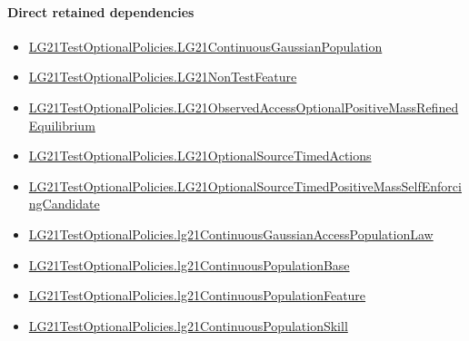 \documentclass[10pt]{article}
\begin{document}
\paragraph{Direct retained dependencies}
\begin{itemize}\raggedright
\item \hyperlink{paper-prerequisite-f5e1c886d250142b}{LG21\allowbreak{}Test\allowbreak{}Optional\allowbreak{}Policies.\allowbreak{}LG21\allowbreak{}Continuous\allowbreak{}Gaussian\allowbreak{}Population}
\item \hyperlink{governing-declaration-81cb73bf3869c56d}{LG21\allowbreak{}Test\allowbreak{}Optional\allowbreak{}Policies.\allowbreak{}LG21\allowbreak{}Non\allowbreak{}Test\allowbreak{}Feature}
\item \hyperlink{governing-declaration-54d577fbb0a632ec}{LG21\allowbreak{}Test\allowbreak{}Optional\allowbreak{}Policies.\allowbreak{}LG21\allowbreak{}Observed\allowbreak{}Access\allowbreak{}Optional\allowbreak{}Positive\allowbreak{}Mass\allowbreak{}Refined\allowbreak{}Equilibrium}
\item \hyperlink{governing-declaration-c053cef5da7104c1}{LG21\allowbreak{}Test\allowbreak{}Optional\allowbreak{}Policies.\allowbreak{}LG21\allowbreak{}Optional\allowbreak{}Source\allowbreak{}Timed\allowbreak{}Actions}
\item \hyperlink{governing-declaration-d43eac84fcf5cb20}{LG21\allowbreak{}Test\allowbreak{}Optional\allowbreak{}Policies.\allowbreak{}LG21\allowbreak{}Optional\allowbreak{}Source\allowbreak{}Timed\allowbreak{}Positive\allowbreak{}Mass\allowbreak{}Self\allowbreak{}Enforcing\allowbreak{}Candidate}
\item \hyperlink{governing-declaration-fa49b6c4b938413f}{LG21\allowbreak{}Test\allowbreak{}Optional\allowbreak{}Policies.\allowbreak{}lg21\allowbreak{}Continuous\allowbreak{}Gaussian\allowbreak{}Access\allowbreak{}Population\allowbreak{}Law}
\item \hyperlink{governing-declaration-3b5146b167dee236}{LG21\allowbreak{}Test\allowbreak{}Optional\allowbreak{}Policies.\allowbreak{}lg21\allowbreak{}Continuous\allowbreak{}Population\allowbreak{}Base}
\item \hyperlink{governing-declaration-f07391974a356bb7}{LG21\allowbreak{}Test\allowbreak{}Optional\allowbreak{}Policies.\allowbreak{}lg21\allowbreak{}Continuous\allowbreak{}Population\allowbreak{}Feature}
\item \hyperlink{governing-declaration-339ce55dcb78dfb9}{LG21\allowbreak{}Test\allowbreak{}Optional\allowbreak{}Policies.\allowbreak{}lg21\allowbreak{}Continuous\allowbreak{}Population\allowbreak{}Skill}
\end{itemize}
\hypertarget{governing-declaration-4f1e0bb5ec5b1259}{}
\end{document}
